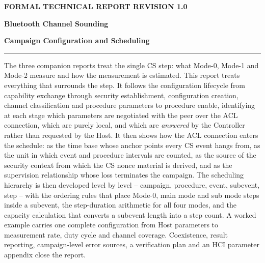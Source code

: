 \documentclass[11pt,a4paper]{article}
\begin{document}
\thispagestyle{empty}
\vspace*{18mm}
{\color{accent}\small\bfseries FORMAL TECHNICAL REPORT \hfill REVISION 1.0}

\vspace{26mm}
{\raggedright\color{navy}\Huge\bfseries Bluetooth Channel Sounding\par}
\vspace{5mm}
{\raggedright\color{navy}\huge\bfseries Campaign Configuration and Scheduling\par}

\vspace{7mm}

\vspace{12mm}
\noindent\rule{\textwidth}{1pt}

\vspace{4mm}
\noindent
The three companion reports treat the single CS step: what Mode-0, Mode-1 and Mode-2 measure and how
the measurement is estimated. This report treats everything that surrounds the step. It follows the
configuration lifecycle from capability exchange through security establishment, configuration
creation, channel classification and procedure parameters to procedure enable, identifying at each
stage which parameters are negotiated with the peer over the ACL connection, which are purely local,
and which are \emph{answered} by the Controller rather than requested by the Host. It then shows how
the ACL connection enters the schedule: as the time base whose anchor points every CS event hangs
from, as the unit in which event and procedure intervals are counted, as the source of the security
context from which the CS nonce material is derived, and as the supervision relationship whose loss
terminates the campaign. The scheduling hierarchy is then developed level by level -- campaign,
procedure, event, subevent, step -- with the ordering rules that place Mode-0, main mode and sub mode
steps inside a subevent, the step-duration arithmetic for all four modes, and the capacity
calculation that converts a subevent length into a step count. A worked example carries one complete
configuration from Host parameters to measurement rate, duty cycle and channel coverage. Coexistence,
result reporting, campaign-level error sources, a verification plan and an HCI parameter appendix
close the report.
\end{document}
